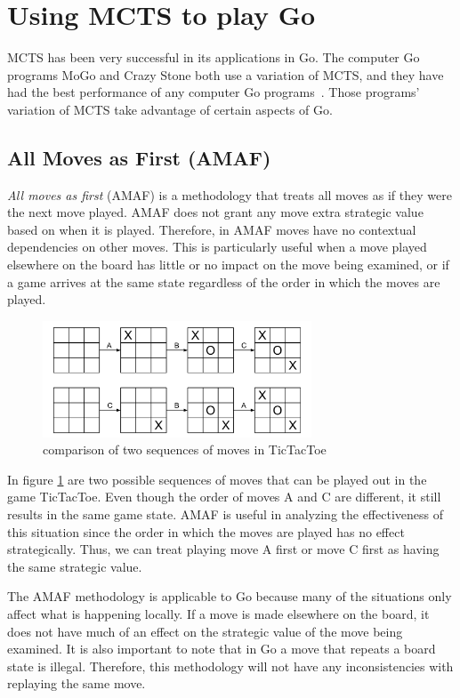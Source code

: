 \documentclass{sig-alternate}
\begin{document}
\section{Using MCTS to play Go}

MCTS has been very successful in its applications in Go. The computer Go programs MoGo and Crazy Stone both use a variation of MCTS, and they have had the best performance of any computer Go programs~\cite{RAVEinGo}. Those programs' variation of MCTS take advantage of certain aspects of Go.

\subsection{All Moves as First (AMAF)}
\textit{All moves as first} (AMAF) is a methodology that treats all moves as if they were the next move played. AMAF does not grant any move extra strategic value based on when it is played. Therefore, in AMAF moves have no contextual dependencies on other moves. This is particularly useful when a move played elsewhere on the board has little or no impact on the move being examined, or if a game arrives at the same state regardless of the order in which the moves are played. 

\begin{figure}[h]
	\includegraphics[width=8cm]{MoveOrderNotMattering.pdf}
	\centering
	\caption{comparison of two sequences of moves in TicTacToe}
	\label{fig:TwoSeq}
\end{figure}

In figure \ref{fig:TwoSeq} are two possible sequences of moves that can be played out in the game TicTacToe. Even though the order of moves A and C are different, it still results in the same game state. AMAF is useful in analyzing the effectiveness of this situation since the order in which the moves are played has no effect strategically. Thus, we can treat playing move A first or move C first as having the same strategic value.

The AMAF methodology is applicable to Go because many of the situations only affect what is happening locally. If a move is made elsewhere on the board, it does not have much of an effect on the strategic value of the move being examined. It is also important to note that in Go a move that repeats a board state is illegal. Therefore, this methodology will not have any inconsistencies with replaying the same move.
\end{document}

